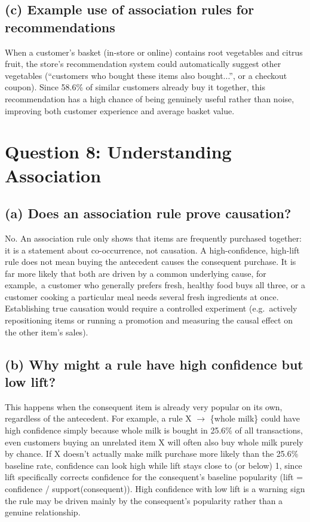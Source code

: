 \documentclass[11pt]{article}
\begin{document}
\subsection*{(c) Example use of association rules for recommendations}
When a customer's basket (in-store or online) contains root vegetables and citrus fruit, the store's recommendation system could automatically suggest other vegetables (``customers who bought these items also bought...'', or a checkout coupon). Since 58.6\% of similar customers already buy it together, this recommendation has a high chance of being genuinely useful rather than noise, improving both customer experience and average basket value.

\section*{Question 8: Understanding Association}

\subsection*{(a) Does an association rule prove causation?}
No. An association rule only shows that items are frequently purchased together: it is a statement about co-occurrence, not causation. A high-confidence, high-lift rule does not mean buying the antecedent causes the consequent purchase. It is far more likely that both are driven by a common underlying cause, for example,\ a customer who generally prefers fresh, healthy food buys all three, or a customer cooking a particular meal needs several fresh ingredients at once. Establishing true causation would require a controlled experiment (e.g.\ actively repositioning items or running a promotion and measuring the causal effect on the other item's sales).

\subsection*{(b) Why might a rule have high confidence but low lift?}
This happens when the consequent item is already very popular on its own, regardless of the antecedent. For example, a rule X $\rightarrow$ \{whole milk\} could have high confidence simply because whole milk is bought in 25.6\% of all transactions, even customers buying an unrelated item X will often also buy whole milk purely by chance. If X doesn't actually make milk purchase more likely than the 25.6\% baseline rate, confidence can look high while lift stays close to (or below) 1, since lift specifically corrects confidence for the consequent's baseline popularity (lift = confidence / support(consequent)). High confidence with low lift is a warning sign the rule may be driven mainly by the consequent's popularity rather than a genuine relationship.
\end{document}
